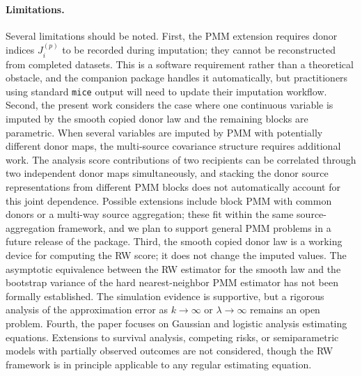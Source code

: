 \paragraph{Limitations.}
Several limitations should be noted.  First, the PMM extension requires
donor indices \(J_i^{(p)}\) to be recorded during imputation; they
cannot be reconstructed from completed datasets.  This is a software
requirement rather than a theoretical obstacle, and the companion package
handles it automatically, but practitioners using standard
\texttt{mice} output will need to update their imputation workflow.
Second, the present work considers the case where one continuous
variable is imputed by the smooth copied donor law and the remaining
blocks are parametric.  When several variables are imputed by PMM with
potentially different donor maps, the multi-source covariance structure
requires additional work.  The analysis score contributions of two
recipients can be correlated through two independent donor maps
simultaneously, and stacking the donor source representations from
different PMM blocks does not automatically account for this joint
dependence.  Possible extensions include block PMM with common donors or
a multi-way source aggregation; these fit within the same
source-aggregation framework, and we plan to support general PMM
problems in a future release of the package.
Third, the smooth copied donor law is a working device for computing the
RW score; it does not change the imputed values.  The asymptotic
equivalence between the RW estimator for the smooth law and the
bootstrap variance of the hard nearest-neighbor PMM estimator has not
been formally established.  The simulation evidence is supportive, but a
rigorous analysis of the approximation error as \(k\to\infty\) or
\(\lambda\to\infty\) remains an open problem.
Fourth, the paper focuses on Gaussian and logistic analysis estimating
equations.  Extensions to survival analysis, competing risks, or
semiparametric models with partially observed outcomes are not
considered, though the RW framework is in principle applicable to any
regular estimating equation.
